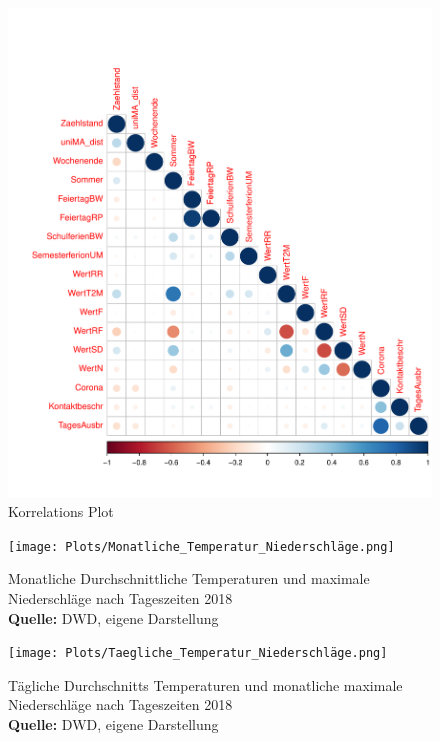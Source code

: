 \documentclass[a4paper,12pt]{thesis}
\newcommand*{\captionsource}[2]{%
	\caption[{#1}]{%
		#1%
		\\\hspace{\linewidth}%
		\textbf{Quelle:} #2%
	}%
}
\begin{document}
\begin{figure}[!ht]
	\centering
	\includegraphics[width=\textwidth]{Plots/Corr_Plot.pdf}
	\caption{Korrelations Plot 
	}
	\label{Figure3}
\end{figure}

\begin{figure}[!ht]
	\centering
	\texttt{[image: Plots/Monatliche\_Temperatur\_Niederschläge.png]}
	\captionsource{Monatliche Durchschnittliche Temperaturen und maximale Niederschläge nach Tageszeiten 2018}{
		DWD, eigene Darstellung
	}
	\label{Figure4}
\end{figure}

\begin{figure}[!ht]
	\centering
	\texttt{[image: Plots/Taegliche\_Temperatur\_Niederschläge.png]}
	\captionsource{Tägliche Durchschnitts Temperaturen und monatliche maximale Niederschläge nach Tageszeiten 2018}{
		DWD, eigene Darstellung
	}
	\label{Figure5}
\end{figure}
\end{document}
